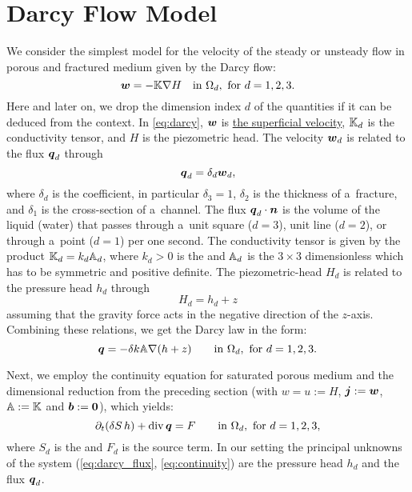 
\section{Darcy Flow Model} \label{sec:darcy_flow}
We consider the simplest model for the velocity of the steady or unsteady flow in porous and fractured medium given by 
the Darcy flow:
\begin{equation}
    \label{eq:darcy}
    \vc w = -\tn K \grad H \quad\text{in }\Omega_d,\ \text{for $d=1,2,3$}.
\end{equation}
Here and later on, we drop the dimension index $d$ of the quantities if it can be deduced from the context.
In \eqref{eq:darcy}, $\mathbf{\boldsymbol{w}}$  is \href{http://en.wikipedia.org/wiki/Superficial_velocity}{the superficial velocity},
${\mathbb{K}}_d$ is the conductivity tensor, and $H$  is the piezometric head. The velocity $\mathbf{\boldsymbol{w}}_d$ is related to the flux $\mathbf{\boldsymbol{q}}_d$ 
 through
\[
    \mathbf{\boldsymbol{q}}_d = \delta_d \mathbf{\boldsymbol{w}}_d,
\]
where $\delta_d$  is the  coefficient,
in particular $\delta_3=1$, $\delta_2$  is the thickness of a~fracture, and $\delta_1$  is the cross-section of a~channel.
The flux $\mathbf{\boldsymbol{q}}_d\cdot\mathbf{\boldsymbol{n}}$ is the volume of the liquid (water) that passes through a~unit square ($d=3$),
unit line ($d=2$), or through a~point ($d=1$) per one second. 
The conductivity tensor is given by the product 
${\mathbb{K}}_d = k_d {\mathbb{A}}_d$, where $k_d>0$ 
 is the   and 
${\mathbb{A}}_d$  is the 
$3\times 3$ dimensionless  which has to be symmetric and positive definite.
The piezometric-head $H_d$ is related to the pressure head
$h_d$ through
\begin{equation}
    \label{eq:piezo_head}
    H_d = h_d + z
\end{equation}
assuming that the gravity force acts in the negative direction of the $z$-axis. 
Combining these relations, we get the Darcy law in the form:
\begin{equation}
    \label{eq:darcy_flux}
    \vc q = -\delta k\tn A \grad (h+z)  \qquad\text{in }\Omega_d,\ \text{for $d=1,2,3$}.
\end{equation}

Next, we employ the continuity equation for saturated porous medium and the dimensional reduction from the preceding section
(with $w=u:=H$, $\mathbf{\boldsymbol{j}}:=\mathbf{\boldsymbol{w}}$, ${\mathbb{A}}:={\mathbb{K}}$ and $\mathbf{\boldsymbol{b}}:=\mathbf{\boldsymbol{0}}$), which yields:
\begin{equation}
    \label{eq:continuity}
    \prtl_t (\delta S\, h) + \div \vc q = F \qquad \text{in }\Omega_d,\ \text{for $d=1,2,3$},
\end{equation}
where  $S_d$  is the  and $F_d$  is 
the source term. In our setting the principal unknowns of the system 
(\ref{eq:darcy_flux}, \ref{eq:continuity}) are the pressure head $h_d$ and the flux $\mathbf{\boldsymbol{q}}_d$.


